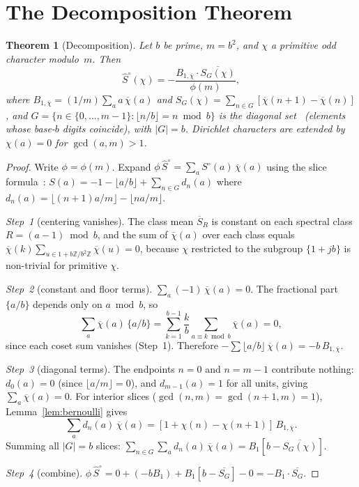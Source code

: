 \documentclass[12pt]{amsart}
\newtheorem{theorem}{Theorem}
\theoremstyle{definition}
\theoremstyle{remark}
\begin{document}
\section{The Decomposition Theorem}

\begin{theorem}[Decomposition]\label{thm:decompose}
Let $b$ be prime, $m = b^2$, and $\chi$ a primitive
odd character modulo~$m$. Then
\[
\hat{S}^{\circ}(\chi)
= -\frac{B_{1,\overline{\chi}} \cdot
\overline{S_G(\chi)}}{\phi(m)},
\]
where $B_{1,\overline{\chi}}
= (1/m) \sum_a a\, \overline{\chi}(a)$ and
$S_G(\chi)
= \sum_{n \in G} [\overline{\chi}(n{+}1)
- \overline{\chi}(n)]$,
and $G = \{n \in \{0, \ldots, m{-}1\} :
\lfloor n/b \rfloor = n \bmod b\}$ is the diagonal
set~\cite{paperA} (elements whose base-$b$ digits
coincide), with $|G| = b$.
Dirichlet characters are extended by $\chi(a) = 0$
for $\gcd(a, m) > 1$.
\end{theorem}

\begin{proof}
Write $\phi = \phi(m)$. Expand
$\phi\, \hat{S}^{\circ} = \sum_a S^{\circ}(a)\,
\overline{\chi}(a)$ using the slice
formula~\cite{paperA}:
$S(a) = -1 - \lfloor a/b \rfloor
+ \sum_{n \in G} d_n(a)$
where $d_n(a) = \lfloor(n{+}1)a/m\rfloor
- \lfloor na/m\rfloor$.

\emph{Step~1} (centering vanishes).
The class mean $\overline{S}_{R}$ is constant on each
spectral class $R = (a{-}1) \bmod b$, and the sum of
$\overline{\chi}(a)$ over each class equals
$\overline{\chi}(k) \sum_{u \in 1+b\mathbb{Z}/b^2\mathbb{Z}}
\overline{\chi}(u) = 0$, because $\chi$
restricted to the subgroup $\{1{+}jb\}$ is
non-trivial for primitive $\chi$.

\emph{Step~2} (constant and floor terms).
$\sum_a (-1)\, \overline{\chi}(a) = 0$.
The fractional part $\{a/b\}$ depends only on
$a \bmod b$, so
\[
\sum_a \overline{\chi}(a)\, \{a/b\}
= \sum_{k=1}^{b-1} \frac{k}{b}
\sum_{a \equiv k \bmod b}
\overline{\chi}(a) = 0,
\]
since each coset sum vanishes (Step~1). Therefore
$-\sum \lfloor a/b \rfloor\, \overline{\chi}(a)
= -b\, B_{1,\overline{\chi}}$.

\emph{Step~3} (diagonal terms).
The endpoints $n = 0$ and $n = m{-}1$ contribute
nothing: $d_0(a) = 0$ (since $\lfloor a/m \rfloor
= 0$), and $d_{m-1}(a) = 1$ for all units, giving
$\sum_a \overline{\chi}(a) = 0$. For interior slices
($\gcd(n, m) = \gcd(n{+}1, m) = 1$),
Lemma~\ref{lem:bernoulli} gives
\[
\sum_a d_n(a)\, \overline{\chi}(a)
= [1 + \chi(n) - \chi(n{+}1)]\,
B_{1,\overline{\chi}}.
\]
Summing all $|G| = b$ slices:
$\sum_{n \in G} \sum_a d_n(a)\,
\overline{\chi}(a)
= B_1 [b - \overline{S_G(\chi)}]$.

\emph{Step~4} (combine).
$\phi\, \hat{S}^{\circ}
= 0 + (-b B_1) + B_1[b - \overline{S_G}] - 0
= -B_1 \cdot \overline{S_G}$.
\end{proof}
\end{document}
